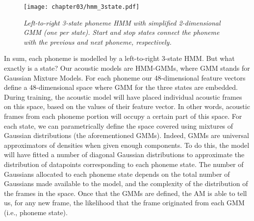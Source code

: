 \begin{figure}[htb]
\centering
\texttt{[image: chapter03/hmm\_3state.pdf]}
\caption{\textit{Left-to-right 3-state phoneme HMM with simplified 2-dimensional GMM (one per state). Start and stop states connect the phoneme with the previous and next phoneme, respectively.}}
\label{fig:hmm_3state}
\end{figure}

In sum, each phoneme is modelled by a left-to-right 3-state HMM. But what exactly is a state? Our acoustic models are HMM-GMMs, where GMM stands for Gaussian Mixture Models. For each phoneme our 48-dimensional feature vectors define a 48-dimensional space where GMM for the three states are embedded. During training, the acoustic model will have placed individual acoustic frames on this space, based on the values of their feature vector. In other words, acoustic frames from each phoneme portion will occupy a certain part of this space. For each state, we can parametrically define the space covered using mixtures of Gaussian distributions (the aforementioned GMMs). Indeed, GMMs are universal approximators of densities when given enough components. To do this, the model will have fitted a number of diagonal Gaussian distributions to approximate the distribution of datapoints corresponding to each phoneme state. The number of Gaussians allocated to each phoneme state depends on the total number of Gaussians made available to the model, and the complexity of the distribution of the frames in the space. Once that the GMMs are defined, the AM is able to tell us, for any new frame, the likelihood that the frame originated from each GMM (i.e., phoneme state).  \\     


